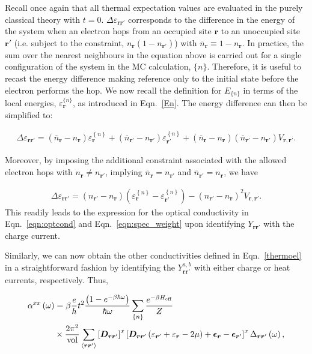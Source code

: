\documentclass[aps,prx,onecolumn,amsmath,nofootinbib,amssymb,11pt]{revtex4-1}
\renewcommand{\vec}[1]{\boldsymbol{#1}}
\def \ve {\varepsilon}
\def \r {{\vec r}}
\def \ve {\varepsilon}
\def \beq {\begin{eqnarray}}
\def \eeq {\end{eqnarray}}
\def \tn {\textnormal}
\begin{document}
{\begin{appendix}
Recall once again that all thermal expectation values are evaluated in the purely classical theory with $t=0$. $\Delta \ve_{\r\r'}$ corresponds to the difference in the energy of the system when an electron hops from an occupied site $\r$ to an unoccupied site $\r'$ (i.e. subject to the constraint, $n_{\r}\left(1-n_{\r'}\right)$) with $\overline{n}_{\r}\equiv 1-n_{\r}$. In practice, the sum over the nearest neighbours in the equation above is carried out for a single configuration of the system in the MC calculation, $\{n \}$. Therefore, it is useful to recast the energy difference making reference only to the initial state before the electron performs the hop. We now recall the definition for $E_{\{n\}}$ in terms of the local energies,  $\varepsilon_{\r}^{\{n\}}$, as introduced in Eqn.~\ref{En}. The energy difference can then be simplified to:

\beq
\Delta\varepsilon_{\r\r'}=\left(\overline{n}_{\r}-n_{\r}\right)\varepsilon_{\r}^{\left\{ n\right\} }+\left(\overline{n}_{\r'}-n_{\r'}\right)\varepsilon_{\r'}^{\left\{ n\right\} }+\left(\overline{n}_{\r}-n_{\r}\right)\left(\overline{n}_{\r'}-n_{\r'}\right)V_{\r,\r'}.
\eeq

Moreover, by imposing the additional constraint associated with the allowed electron hops with $n_{\r}\neq n_{\r'}$, implying $\overline{n}_{\r}=n_{\r'}$ and $\overline{n}_{\r'}=n_{\r}$, we have

\beq
\Delta\varepsilon_{\r\r'}
 =\left(n_{\r'}-n_{\r}\right)\left(\varepsilon_{\r}^{\left\{ n\right\} }-\varepsilon_{\r'}^{\left\{ n\right\} }\right)-\left(n_{\r'}-n_{\r}\right)^{2}V_{\r,\r'}.
\eeq
This readily leads to the expression for the optical conductivity in Eqn.~\ref{eqn:optcond} and Eqn.~\ref{eqn:spec_weight} upon identifying $Y_{\r\r'}$ with the charge current.



Similarly, we can now obtain the other conductivities defined in Eqn.~\ref{thermoel} in a straightforward fashion by identifying the $Y_{\r\r'}^{a,b}$ with either charge or heat currents, respectively. Thus,

\begin{align}
\alpha^{xx}\left(\omega\right) & =\beta  \frac{e}{h}t^2\frac{\left(1-e^{-\beta\hbar\omega}\right)}{\hbar\omega}\sum_{\{n\}}\frac{e^{-\beta H_{\tn{eff}}}}{Z}  \nonumber \\
 & \times \frac{2\pi^{2}}{\textnormal{vol}}\sum_{\left\langle \r\r'\right\rangle }\left[\bm{D}_{\r\r'}\right]^{x}\left[\bm{D}_{\r\r'}\left(\varepsilon_{\r'}+\varepsilon_{\r}-2\mu\right)+\bm{\epsilon}_{\r}-\bm{\epsilon}_{\r'}\right]^{x}\Delta{}_{\r\r'}\left(\omega\right),
\end{align}


\end{appendix}}
\end{document}
